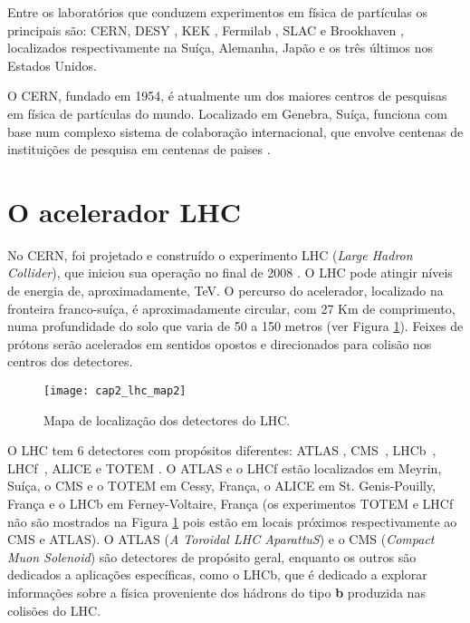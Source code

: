 Entre os laboratórios que conduzem experimentos em física de
partículas os principais são: CERN, DESY \cite{Homepage:desy}, KEK
\cite{homepage:kek}, Fermilab \cite{Homepage:Fermilab}, SLAC
\cite{homepage:slac} e Brookhaven \cite{Homepage:brookhaven},
localizados respectivamente na Suíça, Alemanha, Japão e os três
últimos nos Estados Unidos.

O CERN, fundado em 1954, é atualmente um dos maiores centros de
pesquisas em física de partículas do mundo. Localizado em Genebra,
Suíça, funciona com base num complexo sistema de colaboração
internacional, que envolve centenas de instituições de pesquisa em
centenas de paises \cite{Homepage:CERN}.

\section{O acelerador LHC}

No CERN, foi projetado e construído o experimento LHC (\textit{Large
Hadron Collider}), que iniciou sua operação no final de 2008
\cite{article:LHC:2008,Homepage:lhc}. O LHC pode atingir níveis de
energia de, aproximadamente,  TeV. O percurso do
acelerador, localizado na fronteira franco-suíça, é aproximadamente
circular, com 27 Km de comprimento, numa profundidade do solo que
varia de 50 a 150 metros (ver Figura \ref{mapaLHC}). Feixes de
prótons serão acelerados em sentidos opostos e direcionados para
colisão nos centros dos detectores.

\begin{figure}[b!]
\centering
\texttt{[image: cap2\_lhc\_map2]}
\caption{Mapa de localização dos detectores do LHC.} \label{mapaLHC}
\end{figure}


O LHC tem 6 detectores com propósitos diferentes: ATLAS
\cite{article:ATLAS:2008}, CMS~\cite{article:CMS:2008},
LHCb~\cite{article:LHCb:2008}, LHCf~\cite{article:LHCf:2008}, ALICE
\cite{article:ALICE:2008} e TOTEM \cite{article:TOTEM:2008}. O ATLAS
e o LHCf estão localizados em Meyrin, Suíça, o CMS e o TOTEM em
Cessy, França, o ALICE em St. Genis-Pouilly, França e o LHCb em
Ferney-Voltaire, França (os experimentos TOTEM e LHCf não são
mostrados na Figura \ref{mapaLHC} pois estão em locais próximos respectivamente ao
CMS e ATLAS). O ATLAS (\textit{A Toroidal LHC AparattuS}) e o CMS
(\textit{Compact Muon Solenoid}) são detectores de propósito geral,
enquanto os outros são dedicados a aplicações específicas, como o
LHCb, que é dedicado a explorar informações sobre a física
proveniente dos hádrons do tipo \textbf{b} produzida nas colisões do
LHC.

